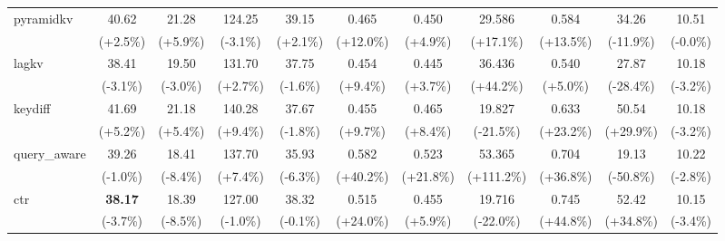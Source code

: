 \begin{table}[t]
{\begin{tabular}{l|cccccccccc}
    pyramidkv & 40.62 & 21.28 & 124.25 & 39.15 & 0.465 & 0.450 & 29.586 & 0.584 & 34.26 & 10.51 \\
     & {\tiny\color{red!70!black}(+2.5\%)} & {\tiny\color{red!70!black}(+5.9\%)} & {\tiny\color{green!60!black}(-3.1\%)} & {\tiny\color{red!70!black}(+2.1\%)} & {\tiny\color{red!70!black}(+12.0\%)} & {\tiny\color{red!70!black}(+4.9\%)} & {\tiny\color{red!70!black}(+17.1\%)} & {\tiny\color{red!70!black}(+13.5\%)} & {\tiny\color{red!70!black}(-11.9\%)} & {\tiny\color{green!60!black}(-0.0\%)} \\
    lagkv & 38.41 & 19.50 & 131.70 & 37.75 & 0.454 & 0.445 & 36.436 & 0.540 & 27.87 & 10.18 \\
     & {\tiny\color{green!60!black}(-3.1\%)} & {\tiny\color{green!60!black}(-3.0\%)} & {\tiny\color{red!70!black}(+2.7\%)} & {\tiny\color{green!60!black}(-1.6\%)} & {\tiny\color{red!70!black}(+9.4\%)} & {\tiny\color{red!70!black}(+3.7\%)} & {\tiny\color{red!70!black}(+44.2\%)} & {\tiny\color{red!70!black}(+5.0\%)} & {\tiny\color{red!70!black}(-28.4\%)} & {\tiny\color{green!60!black}(-3.2\%)} \\
    keydiff & 41.69 & 21.18 & 140.28 & 37.67 & 0.455 & 0.465 & 19.827 & 0.633 & 50.54 & 10.18 \\
     & {\tiny\color{red!70!black}(+5.2\%)} & {\tiny\color{red!70!black}(+5.4\%)} & {\tiny\color{red!70!black}(+9.4\%)} & {\tiny\color{green!60!black}(-1.8\%)} & {\tiny\color{red!70!black}(+9.7\%)} & {\tiny\color{red!70!black}(+8.4\%)} & {\tiny\color{green!60!black}(-21.5\%)} & {\tiny\color{red!70!black}(+23.2\%)} & {\tiny\color{green!60!black}(+29.9\%)} & {\tiny\color{green!60!black}(-3.2\%)} \\
    query\_aware & 39.26 & 18.41 & 137.70 & 35.93 & 0.582 & 0.523 & 53.365 & 0.704 & 19.13 & 10.22 \\
     & {\tiny\color{green!60!black}(-1.0\%)} & {\tiny\color{green!60!black}(-8.4\%)} & {\tiny\color{red!70!black}(+7.4\%)} & {\tiny\color{green!60!black}(-6.3\%)} & {\tiny\color{red!70!black}(+40.2\%)} & {\tiny\color{red!70!black}(+21.8\%)} & {\tiny\color{red!70!black}(+111.2\%)} & {\tiny\color{red!70!black}(+36.8\%)} & {\tiny\color{red!70!black}(-50.8\%)} & {\tiny\color{green!60!black}(-2.8\%)} \\
    ctr & \textbf{38.17} & 18.39 & 127.00 & 38.32 & 0.515 & 0.455 & 19.716 & 0.745 & 52.42 & 10.15 \\
     & {\tiny\color{green!60!black}(-3.7\%)} & {\tiny\color{green!60!black}(-8.5\%)} & {\tiny\color{green!60!black}(-1.0\%)} & {\tiny\color{green!60!black}(-0.1\%)} & {\tiny\color{red!70!black}(+24.0\%)} & {\tiny\color{red!70!black}(+5.9\%)} & {\tiny\color{green!60!black}(-22.0\%)} & {\tiny\color{red!70!black}(+44.8\%)} & {\tiny\color{green!60!black}(+34.8\%)} & {\tiny\color{green!60!black}(-3.4\%)} \\

\end{tabular}}
\end{table}
